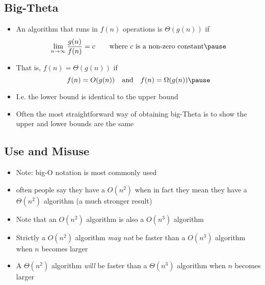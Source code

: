 \begin{slide}
\section{Big-Theta}

\begin{PauseHighLight}
  \begin{itemize}
  \item An algorithm that runs in $f(n)$ operations is $\Theta(g(n))$ if
    \begin{displaymath}
      \lim_{n\rightarrow\infty} \frac{g(n)}{f(n)} = c \qquad
      \mbox{where $c$ is a non-zero constant}\pause
    \end{displaymath}
  \item That is, $f(n)=\Theta(g(n))$ if
    \begin{displaymath}
      f(n) = O(g(n)) \quad \mbox{and} \quad f(n) = \Omega(g(n))\pause
    \end{displaymath}
  \item I.e. the lower bound is identical to the upper bound\pause
  \item Often the most straightforward way of obtaining big-Theta is to
    show the upper and lower bounds are the same\pause
  \end{itemize}
\end{PauseHighLight}

\end{slide}


\begin{slide}
\section[-1]{Use and Misuse}

\begin{PauseHighLight}
  \begin{itemize}
  \item Note: big-O notation is most commonly used\pause
  \item often people say they have a $O(n^2)$ when in fact they mean
    they have a $\Theta(n^2)$ algorithm\pause{} (a much stronger result)\pauseb
  \item Note that an $O(n^2)$ algorithm is also a $O(n^3)$ algorithm\pause
  \item Strictly a $O(n^2)$ algorithm \emph{may not} be faster than a
    $O(n^3)$ algorithm when $n$ becomes larger\pause
  \item A $\Theta(n^2)$ algorithm \emph{will} be faster than a $\Theta(n^3)$
    algorithm when $n$ becomes larger\pause
  \end{itemize}
\end{PauseHighLight}

\end{slide}

